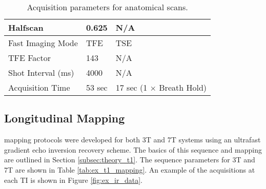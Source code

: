 \begin{table}[H]
\begin{tabularx}{1.0\textwidth}{X|X|X}
		Halfscan                                & 0.625               & N/A                      \\ \hline
		Fast Imaging Mode                       & TFE                 & TSE                      \\ \hline
		TFE Factor                              & 143                 & N/A                      \\ \hline
		Shot Interval (ms)                      & 4000                & N/A                      \\ \hline
		Acquisition Time                        & 53 sec              & 17 sec (1 $\times$ Breath Hold)
	\end{tabularx}
	\caption{Acquisition parameters for anatomical scans.}
	\label{tab:ex_anatomical}
\end{table}

\subsection{Longitudinal \tone Mapping}
\tone mapping protocols were developed for both 3T and 7T systems using an ultrafast gradient echo inversion recovery scheme. The basics of this sequence and \tone mapping are outlined in Section \ref{subsec:theory_t1}. The sequence parameters for 3T and 7T are shown in Table \ref{tab:ex_t1_mapping}. An example of the acquisitions at each \ac{TI} is shown in Figure \ref{fig:ex_ir_data}.

